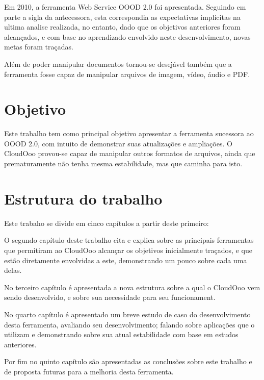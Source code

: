 Em 2010, a ferramenta Web Service OOOD 2.0 foi apresentada. Seguindo em parte a sigla da antecessora, esta correspondia as expectativas implícitas na ultima analise realizada, no entanto, dado que os objetivos anteriores foram alcançados, e com base no aprendizado envolvido neste desenvolvimento, novas metas foram traçadas.

Além de poder manipular documentos tornou-se desejável também que a ferramenta fosse capaz de manipular arquivos de imagem, vídeo, áudio e PDF.

\section{Objetivo}

Este trabalho tem como principal objetivo apresentar a ferramenta sucessora ao OOOD 2.0, com intuito de demonstrar suas atualizações e ampliações. O CloudOoo provou-se capaz de manipular outros formatos de arquivos, ainda que prematuramente não tenha mesma estabilidade, mas que caminha para isto.

\section{Estrutura do trabalho}

Este trabaho se divide em cinco capítulos a partir deste primeiro:

O segundo capítulo deste trabalho cita e explica sobre as principais ferramentas que permitiram ao CloudOoo alcançar os objetivos inicialmente traçados, e que estão diretamente envolvidas a este, demonstrando um pouco sobre cada uma delas.

No terceiro capítulo é apresentada a nova estrutura sobre a qual o CloudOoo vem sendo desenvolvido, e sobre sua necessidade para seu funcionament.

No quarto capítulo é apresentado um breve estudo de caso do desenvolvimento desta ferramenta, avaliando seu desenvolvimento; falando sobre aplicações que o utilizam e demonstrando sobre sua atual estabilidade com base em estudos anteriores.

Por fim no quinto capítulo são apresentadas as conclusões sobre este trabalho e de proposta futuras para a melhoria desta ferramenta.
